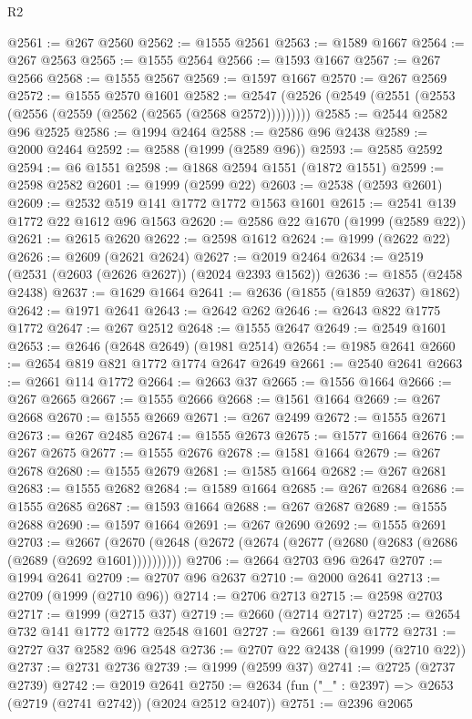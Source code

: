 \begin{lexlean}{R2}
\begin{coremodule}
@2561 := @267 @2560
@2562 := @1555 @2561
@2563 := @1589 @1667
@2564 := @267 @2563
@2565 := @1555 @2564
@2566 := @1593 @1667
@2567 := @267 @2566
@2568 := @1555 @2567
@2569 := @1597 @1667
@2570 := @267 @2569
@2572 := @1555 @2570 @1601
@2582 := @2547 (@2526 (@2549 (@2551 (@2553 (@2556 (@2559 (@2562 (@2565 (@2568 @2572)))))))))
@2585 := @2544 @2582 @96 @2525
@2586 := @1994 @2464
@2588 := @2586 @96 @2438
@2589 := @2000 @2464
@2592 := @2588 (@1999 (@2589 @96))
@2593 := @2585 @2592
@2594 := @6 @1551
@2598 := @1868 @2594 @1551 (@1872 @1551)
@2599 := @2598 @2582
@2601 := @1999 (@2599 @22)
@2603 := @2538 (@2593 @2601)
@2609 := @2532 @519 @141 @1772 @1772 @1563 @1601
@2615 := @2541 @139 @1772 @22 @1612 @96 @1563
@2620 := @2586 @22 @1670 (@1999 (@2589 @22))
@2621 := @2615 @2620
@2622 := @2598 @1612
@2624 := @1999 (@2622 @22)
@2626 := @2609 (@2621 @2624)
@2627 := @2019 @2464
@2634 := @2519 (@2531 (@2603 (@2626 @2627)) (@2024 @2393 @1562))
@2636 := @1855 (@2458 @2438)
@2637 := @1629 @1664
@2641 := @2636 (@1855 (@1859 @2637) @1862)
@2642 := @1971 @2641
@2643 := @2642 @262
@2646 := @2643 @822 @1775 @1772
@2647 := @267 @2512
@2648 := @1555 @2647
@2649 := @2549 @1601
@2653 := @2646 (@2648 @2649) (@1981 @2514)
@2654 := @1985 @2641
@2660 := @2654 @819 @821 @1772 @1774 @2647 @2649
@2661 := @2540 @2641
@2663 := @2661 @114 @1772
@2664 := @2663 @37
@2665 := @1556 @1664
@2666 := @267 @2665
@2667 := @1555 @2666
@2668 := @1561 @1664
@2669 := @267 @2668
@2670 := @1555 @2669
@2671 := @267 @2499
@2672 := @1555 @2671
@2673 := @267 @2485
@2674 := @1555 @2673
@2675 := @1577 @1664
@2676 := @267 @2675
@2677 := @1555 @2676
@2678 := @1581 @1664
@2679 := @267 @2678
@2680 := @1555 @2679
@2681 := @1585 @1664
@2682 := @267 @2681
@2683 := @1555 @2682
@2684 := @1589 @1664
@2685 := @267 @2684
@2686 := @1555 @2685
@2687 := @1593 @1664
@2688 := @267 @2687
@2689 := @1555 @2688
@2690 := @1597 @1664
@2691 := @267 @2690
@2692 := @1555 @2691
@2703 := @2667 (@2670 (@2648 (@2672 (@2674 (@2677 (@2680 (@2683 (@2686 (@2689 (@2692 @1601))))))))))
@2706 := @2664 @2703 @96 @2647
@2707 := @1994 @2641
@2709 := @2707 @96 @2637
@2710 := @2000 @2641
@2713 := @2709 (@1999 (@2710 @96))
@2714 := @2706 @2713
@2715 := @2598 @2703
@2717 := @1999 (@2715 @37)
@2719 := @2660 (@2714 @2717)
@2725 := @2654 @732 @141 @1772 @1772 @2548 @1601
@2727 := @2661 @139 @1772
@2731 := @2727 @37 @2582 @96 @2548
@2736 := @2707 @22 @2438 (@1999 (@2710 @22))
@2737 := @2731 @2736
@2739 := @1999 (@2599 @37)
@2741 := @2725 (@2737 @2739)
@2742 := @2019 @2641
@2750 := @2634 (fun ("_" : @2397) => @2653 (@2719 (@2741 @2742)) (@2024 @2512 @2407))
@2751 := @2396 @2065

\end{coremodule}
\end{lexlean}
